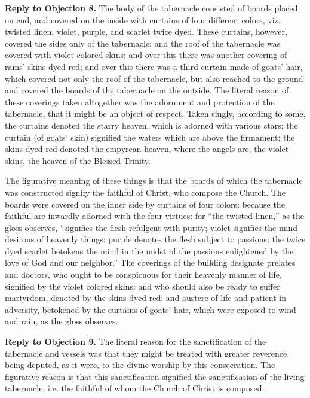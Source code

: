 \textbf{Reply to Objection 8.} The body of the tabernacle consisted of boards placed on end, and covered on the inside with curtains of four different colors, viz. twisted linen, violet, purple, and scarlet twice dyed. These curtains, however, covered the sides only of the tabernacle; and the roof of the tabernacle was covered with violet-colored skins; and over this there was another covering of rams' skins dyed red; and over this there was a third curtain made of goats' hair, which covered not only the roof of the tabernacle, but also reached to the ground and covered the boards of the tabernacle on the outside. The literal reason of these coverings taken altogether was the adornment and protection of the tabernacle, that it might be an object of respect. Taken singly, according to some, the curtains denoted the starry heaven, which is adorned with various stars; the curtain (of goats' skin) signified the waters which are above the firmament; the skins dyed red denoted the empyrean heaven, where the angels are; the violet skins, the heaven of the Blessed Trinity.

The figurative meaning of these things is that the boards of which the tabernacle was constructed signify the faithful of Christ, who compose the Church. The boards were covered on the inner side by curtains of four colors: because the faithful are inwardly adorned with the four virtues: for ``the twisted linen,'' as the gloss observes, ``signifies the flesh refulgent with purity; violet signifies the mind desirous of heavenly things; purple denotes the flesh subject to passions; the twice dyed scarlet betokens the mind in the midst of the passions enlightened by the love of God and our neighbor.'' The coverings of the building designate prelates and doctors, who ought to be conspicuous for their heavenly manner of life, signified by the violet colored skins: and who should also be ready to suffer martyrdom, denoted by the skins dyed red; and austere of life and patient in adversity, betokened by the curtains of goats' hair, which were exposed to wind and rain, as the gloss observes.

\textbf{Reply to Objection 9.} The literal reason for the sanctification of the tabernacle and vessels was that they might be treated with greater reverence, being deputed, as it were, to the divine worship by this consecration. The figurative reason is that this sanctification signified the sanctification of the living tabernacle, i.e. the faithful of whom the Church of Christ is composed.

